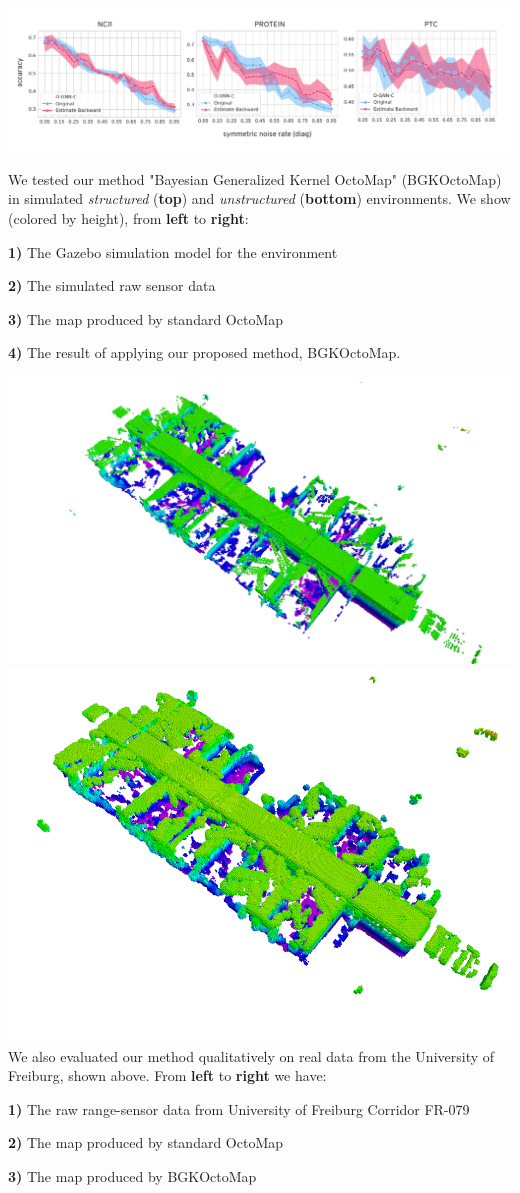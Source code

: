 \documentclass[portrait,final,archD,fontscale=0.477]{baposter}
\begin{document}
\begin{poster}
{\includegraphics[width=0.9\linewidth]{img/notgood}

We tested our method "Bayesian Generalized Kernel OctoMap" (BGKOctoMap) in simulated \textit{structured} (\textbf{top}) and \textit{unstructured} (\textbf{bottom}) environments. We show (colored by height), from \textbf{left} to \textbf{right}: 

\textbf{1)} The Gazebo simulation model for the environment

\textbf{2)} The simulated raw sensor data

\textbf{3)} The map produced by standard OctoMap

\textbf{4)} The result of applying our proposed method, BGKOctoMap.

\vspace{0.1em}

{
\includegraphics[width=0.3\linewidth]{img/fr_corridor_octomap}
\includegraphics[width=0.3\linewidth]{img/fr_corri2}
}
\\

We also evaluated our method qualitatively on real data from the University of Freiburg, shown above. From \textbf{left} to \textbf{right} we have:

\textbf{1)} The raw range-sensor data from University of Freiburg Corridor FR-079

\textbf{2)} The map produced by standard OctoMap

\textbf{3)} The map produced by BGKOctoMap

\vspace{0.1em}
\begin{multicols}{2}


\end{multicols}}
\end{poster}
\end{document}
